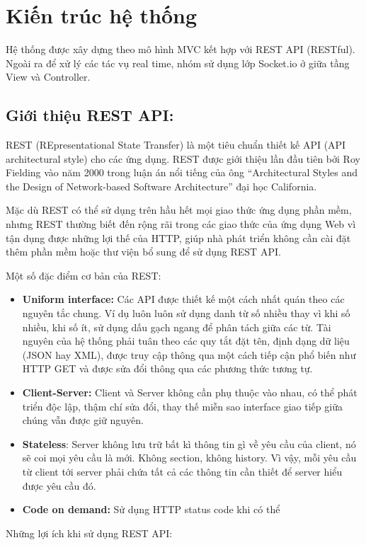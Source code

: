 \section{Kiến trúc hệ thống}
\indent 
    Hệ thống được xây dựng theo mô hình MVC kết hợp với REST API (RESTful). Ngoài ra để xử lý các tác vụ real time, nhóm sử dụng lớp Socket.io ở giữa tầng View và Controller.
\subsection{Giới thiệu REST API:}
REST (REpresentational State Transfer) là một tiêu chuẩn thiết kế API (API architectural style) cho các ứng dụng. REST được giới thiệu lần đầu tiên bởi Roy Fielding vào năm 2000 trong luận án nổi tiếng của ông ``Architectural Styles and
the Design of Network-based Software Architecture'' đại học California.

Mặc dù REST có thể sử dụng trên hầu hết mọi giao thức ứng dụng phần mềm, nhưng REST thường biết đến rộng rãi trong các giao thức của ứng dụng Web vì tận dụng được những lợi thế của HTTP, giúp nhà phát triển không cần cài đặt thêm phần mềm hoặc thư viện bổ sung để sử dụng REST API.

Một số đặc điểm cơ bản của REST:
\begin{itemize}
    \item \textbf{Uniform interface:} Các API được thiết kế một cách nhất quán theo các nguyên tắc chung. Ví dụ luôn luôn sử dụng danh từ số nhiều thay vì khi số nhiều, khi số ít, sử dụng dấu gạch ngang để phân tách giữa các từ. Tài nguyên của hệ thống phải tuân theo các quy tắt đặt tên, định dạng dữ liệu (JSON hay XML), được truy cập thông qua một cách tiếp cận phổ biến như HTTP GET và được sửa đổi thông qua các phương thức tương tự.
    \item \textbf{Client-Server:} Client và Server không cần phụ thuộc vào nhau, có thể phát triển độc lập, thậm chí sửa đổi, thay thế miễn sao interface giao tiếp giữa chúng vẫn được giữ nguyên.
    \item \textbf{Stateless}: Server không lưu trữ bất kì thông tin gì về yêu cầu của client, nó sẽ coi mọi yêu cầu là mới. Không section, không history. Vì vậy, mỗi yêu cầu từ client tới server phải chứa tất cả các thông tin cần thiết để  server hiểu được yêu cầu đó.
    \item \textbf{Code on demand:} Sử dụng HTTP status code khi có thể
\end{itemize}


Những lợi ích khi sử dụng REST API:

